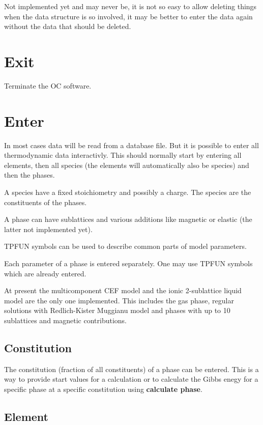 \documentclass[12pt]{article}
\begin{document}
Not implemented yet and may never be, it is not so easy to allow
deleting things when the data structure is so involved, it may be
better to enter the data again without the data that should be
deleted.

\section{Exit }

Terminate the OC software.

\section{Enter }

In most cases data will be read from a database file.  But it is
possible to enter all thermodynamic data interactivly.  This should
normally start by entering all elements, then all species (the
elements will automatically also be species) and then the phases.

A species have a fixed stoichiometry and possibly a charge.  The
species are the constituents of the phases.

A phase can have sublattices and various additions like magnetic or
elastic (the latter not implemented yet).  

TPFUN symbols can be used to describe common parts of model
parameters.

Each parameter of a phase is entered separately.  One may use
TPFUN symbols which are already entered.

At present the multicomponent CEF model and the ionic 2-sublattice
liquid model are the only one implemented.  This includes the gas
phase, regular solutions with Redlich-Kister Muggianu model and phases
with up to 10 sublattices and magnetic contributions.

\subsection{Constitution}

The constitution (fraction of all constituents) of a phase can be
entered.  This is a way to provide start values for a calculation or
to calculate the Gibbs enegy for a specific phase at a specific
constitution using {\bf calculate phase}.

\subsection{Element}
\end{document}
